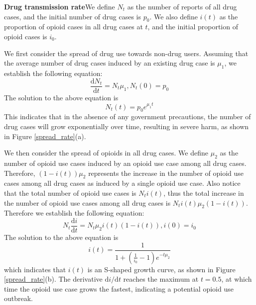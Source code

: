 \textbf{Drug transmission rate}\cite{SIR_mu}\quad We define $N_t$ as the number of reports of all drug cases, and the initial number of drug cases is $p_0$. We also define $i(t)$ as the proportion of opioid cases in all drug cases at $t$, and the initial proportion of opioid cases is $i_0$.

We first consider the spread of drug use towards non-drug users. Assuming that the average number of drug cases induced by an existing drug case is $\mu_1$, we establish the following equation:
\begin{equation}
	\frac{\mathrm{d}N_t}{\mathrm{d}t}=N_t\mu_1,N_t(0)=p_0
	\label{S}
\end{equation}
The solution to the above equation is
\begin{equation}
N_t(t)=p_0e^{\mu_1t}
\end{equation}
This indicates that in the absence of any government precautions, the number of drug cases will grow exponentially over time, resulting in severe harm, as shown in Figure \ref{spread_rate}(a).

We then consider the spread of opioids in all drug cases. We define $\mu_2$ as the number of opioid use cases induced by an opioid use case among all drug cases. Therefore, $(1-i(t))\mu_2$ represents the increase in the number of opioid use cases among all drug cases as induced by a single opioid use case. Also notice that the total number of opioid use cases is $N_ti(t)$, thus the total increase in the number of opioid use cases among all drug cases is $N_ti(t)\mu_2(1-i(t))$. Therefore we establish the following equation:
\begin{equation}
	N_t \frac{\mathrm{d}i}{\mathrm{d}t}=
	N_t \mu_2 i(t)(1-i(t)),i(0)=i_0 
	\label{SI}
\end{equation}
The solution to the above equation is
\begin{equation}
i(t)=\frac{1}{1+(\frac{1}{i_0}-1)e^{-t\mu_2}}
\end{equation}
which indicates that $i(t)$ is an S-shaped growth curve, as shown in Figure \ref{spread_rate}(b). The derivative $\mathrm{d}i/\mathrm{d}t$ reaches the maximum at $t=0.5$, at which time the opioid use case grows the fastest, indicating a potential opioid use outbreak.

